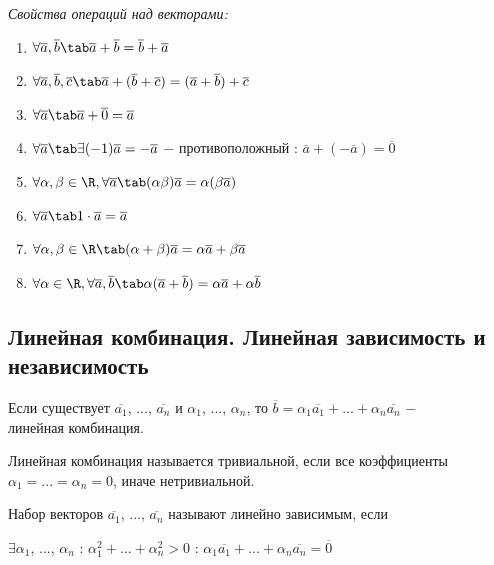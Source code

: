 \textit{Свойства операций над векторами:}
\begin{enumerate}
	\item $\forall\overline{a},\overline{b}\tab\overline{a} + \overline{b} = \overline{b} + \overline{a}$
	\item $\forall\overline{a},\overline{b},\overline{c}\tab\overline{a} + (\overline{b} + \overline{c}) = (\overline{a} + \overline{b}) + \overline{c}$
	\item $\forall\overline{a}\tab\overline{a} + \overline{0} = \overline{a}$
	\item $\forall\overline{a}\tab\exists(-1)\overline{a} = -\overline{a}$ $-$ противоположный : $\overline{a} + (-\overline{a}) = \overline{0}$
	\item $\forall \alpha,\beta\in\R,\forall\overline{a}\tab(\alpha\beta)\overline{a}=\alpha(\beta\overline{a})$
	\item$\forall\overline{a}\tab1\cdot\overline{a}=\overline{a}$
	\item$\forall\alpha,\beta\in\R\tab(\alpha + \beta)\overline{a} = \alpha\overline{a}+\beta\overline{a}$
	\item$\forall\alpha\in\R,\forall\overline{a},\overline{b}\tab\alpha(\overline{a}+\overline{b})=\alpha\overline{a}+\alpha\overline{b}$
\end{enumerate}
\subsection{Линейная комбинация. Линейная зависимость и независимость}

\begin{definition}
	Если существует $\overline{a_1}$, ..., $\overline{a_n}$ и $\alpha_1$, ..., $\alpha_n$, то $\overline{b}=\alpha_1\overline{a_1}+...+\alpha_n\overline{a_n}$ $-$ $\textit{линейная комбинация}$. 
\end{definition}

Линейная комбинация называется $\textit{тривиальной}$, если все коэффициенты $\alpha_1=...=\alpha_n=0$, иначе $\textit{нетривиальной}$.

\begin{definition}
	Набор векторов $\overline{a_1}$, ..., $\overline{a_n}$ называют $\textit{линейно зависимым}$, если
	\begin{center}
		$\exists\alpha_1$, ..., $\alpha_n$ : $\alpha_1^2+...+\alpha_n^2 > 0$ : $\alpha_1\overline{a_1}+...+\alpha_n\overline{a_n} = \overline{0}$
	\end{center}
\end{definition}

